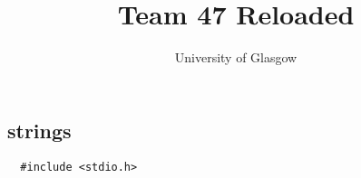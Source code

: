 \documentclass[a4paper,10pt]{article}
\title{Team 47 Reloaded}
\author{University of Glasgow}
\begin{document}
\maketitle


\begin{multicols}{2}
 \section*{strings}
 
 \begin{verbatim}
  #include <stdio.h>
 \end{verbatim}

 
\end{multicols}
\end{document}
